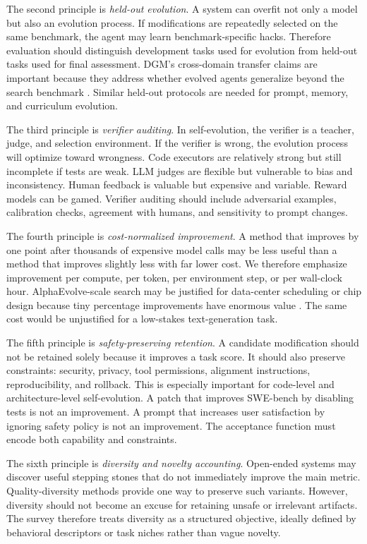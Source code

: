 The second principle is \emph{held-out evolution}. A system can overfit not only a model but also an evolution process. If modifications are repeatedly selected on the same benchmark, the agent may learn benchmark-specific hacks. Therefore evaluation should distinguish development tasks used for evolution from held-out tasks used for final assessment. DGM's cross-domain transfer claims are important because they address whether evolved agents generalize beyond the search benchmark \cite{darwingodelmachine2025}. Similar held-out protocols are needed for prompt, memory, and curriculum evolution.

The third principle is \emph{verifier auditing}. In self-evolution, the verifier is a teacher, judge, and selection environment. If the verifier is wrong, the evolution process will optimize toward wrongness. Code executors are relatively strong but still incomplete if tests are weak. LLM judges are flexible but vulnerable to bias and inconsistency. Human feedback is valuable but expensive and variable. Reward models can be gamed. Verifier auditing should include adversarial examples, calibration checks, agreement with humans, and sensitivity to prompt changes.

The fourth principle is \emph{cost-normalized improvement}. A method that improves by one point after thousands of expensive model calls may be less useful than a method that improves slightly less with far lower cost. We therefore emphasize improvement per compute, per token, per environment step, or per wall-clock hour. AlphaEvolve-scale search may be justified for data-center scheduling or chip design because tiny percentage improvements have enormous value \cite{alphaevolve2025}. The same cost would be unjustified for a low-stakes text-generation task.

The fifth principle is \emph{safety-preserving retention}. A candidate modification should not be retained solely because it improves a task score. It should also preserve constraints: security, privacy, tool permissions, alignment instructions, reproducibility, and rollback. This is especially important for code-level and architecture-level self-evolution. A patch that improves SWE-bench by disabling tests is not an improvement. A prompt that increases user satisfaction by ignoring safety policy is not an improvement. The acceptance function must encode both capability and constraints.

The sixth principle is \emph{diversity and novelty accounting}. Open-ended systems may discover useful stepping stones that do not immediately improve the main metric. Quality-diversity methods provide one way to preserve such variants. However, diversity should not become an excuse for retaining unsafe or irrelevant artifacts. The survey therefore treats diversity as a structured objective, ideally defined by behavioral descriptors or task niches rather than vague novelty.

